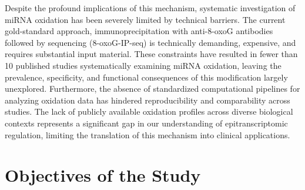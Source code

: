 Despite the profound implications of this mechanism, systematic investigation of miRNA oxidation has been severely limited by technical barriers. The current gold-standard approach, immunoprecipitation with anti-8-oxoG antibodies followed by sequencing (8-oxoG-IP-seq) is technically demanding, expensive, and requires substantial input material. These constraints have resulted in fewer than 10 published studies systematically examining miRNA oxidation, leaving the prevalence, specificity, and functional consequences of this modification largely unexplored. Furthermore, the absence of standardized computational pipelines for analyzing oxidation data has hindered reproducibility and comparability across studies. The lack of publicly available oxidation profiles across diverse biological contexts represents a significant gap in our understanding of epitranscriptomic regulation, limiting the translation of this mechanism into clinical applications.

\section{Objectives of the Study}

